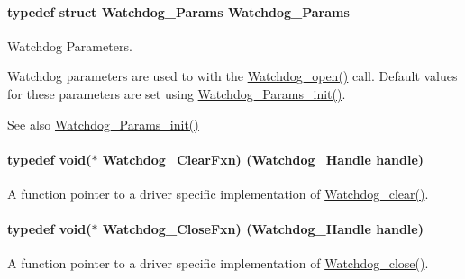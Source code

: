 \paragraph[{Watchdog\+\_\+\+Params}]{\setlength{\rightskip}{0pt plus 5cm}typedef struct {\bf Watchdog\+\_\+\+Params}  {\bf Watchdog\+\_\+\+Params}}\label{_watchdog_8h_a001003d331ef831675e9a8388a81041c}


Watchdog Parameters. 

Watchdog parameters are used to with the \hyperlink{_watchdog_8h_aa5ce656aa6d5199e1efdb4ca2cd9fb7c}{Watchdog\+\_\+open()} call. Default values for these parameters are set using \hyperlink{_watchdog_8h_a6a6f54cfdac33d3bf33464a212262afc}{Watchdog\+\_\+\+Params\+\_\+init()}.

\begin{DoxySeeAlso}{See also}
\hyperlink{_watchdog_8h_a6a6f54cfdac33d3bf33464a212262afc}{Watchdog\+\_\+\+Params\+\_\+init()} 
\end{DoxySeeAlso}
\paragraph[{Watchdog\+\_\+\+Clear\+Fxn}]{\setlength{\rightskip}{0pt plus 5cm}typedef void($\ast$ Watchdog\+\_\+\+Clear\+Fxn) ({\bf Watchdog\+\_\+\+Handle} handle)}\label{_watchdog_8h_a0315c4931ba68423472f47c23c86f296}


A function pointer to a driver specific implementation of \hyperlink{_watchdog_8h_a396decd6b1807db10c636f9987c3be4c}{Watchdog\+\_\+clear()}. 

\paragraph[{Watchdog\+\_\+\+Close\+Fxn}]{\setlength{\rightskip}{0pt plus 5cm}typedef void($\ast$ Watchdog\+\_\+\+Close\+Fxn) ({\bf Watchdog\+\_\+\+Handle} handle)}\label{_watchdog_8h_a2d13686bc3dd7fdb05ec97d63be489ee}


A function pointer to a driver specific implementation of \hyperlink{_watchdog_8h_a1c0dfea7011b06f303d01afb631ffbdd}{Watchdog\+\_\+close()}. 

